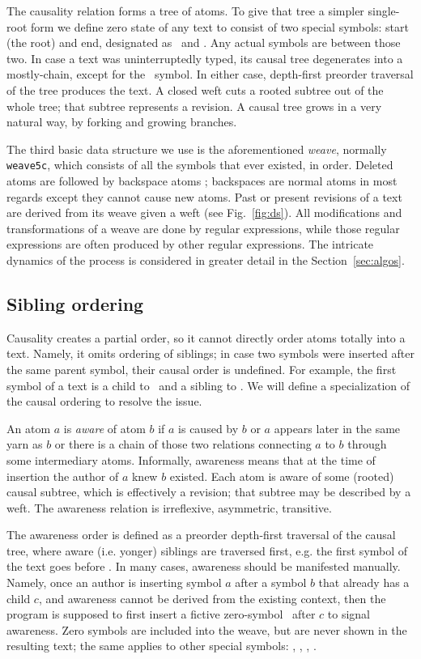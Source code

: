 \documentclass{acm_proc_article-sp}
\begin{document}
The causality relation forms a tree of atoms.
To give that tree a simpler single-root form we define zero
state of any text to consist of two special symbols: start (the root)
and end, designated as \aum ~and \eoa. Any actual symbols are
between those two.
In case a text was uninterruptedly typed, its causal tree
degenerates into a mostly-chain, except for the \eoa ~symbol.
In either case, depth-first preorder traversal of the tree
produces the text. A closed weft cuts a rooted subtree out
of the whole tree; that subtree represents a revision.
A causal tree grows in a very natural way, by forking and
growing branches.

The third basic data structure we use is the aforementioned
\emph{weave}, normally {\tt weave5c},
which consists of all the symbols that ever existed, in order. 
Deleted atoms are followed by backspace atoms \bsp; backspaces
are normal atoms in most regards except they cannot cause
new atoms.
Past or present revisions of a text are derived from its
weave given a weft (see Fig.~\ref{fig:ds}).
All modifications and transformations of a weave are done by
regular expressions, while those regular expressions are often
produced by other regular expressions. The intricate dynamics of
the process is considered in greater detail in the 
Section~\ref{sec:algos}.

\subsection {Sibling ordering}  \label{sec:siblord}

Causality creates a partial order, so it
cannot directly order atoms totally into a text. Namely, it
omits ordering of siblings; in case two symbols were inserted
after the same parent symbol, their causal order is undefined.
For example, the first symbol of a text is a child to \aum
~and a sibling to \eoa. We will define a specialization of  
the causal ordering to resolve the issue.

An atom $a$ is \emph{aware} of atom $b$ if $a$ is caused
by $b$ or $a$ appears later in the same yarn as $b$ or
there is a chain of those two relations connecting $a$ to 
$b$ through some intermediary atoms.
Informally, awareness means that at the time of insertion
the author of $a$ knew $b$ existed. 
Each atom is aware of some (rooted) causal subtree, which
is effectively a revision; that subtree may be described
by a weft.
The awareness relation is irreflexive, asymmetric, transitive.

The awareness order is 
defined as a preorder depth-first traversal of the causal
tree, where aware (i.e. yonger) siblings are traversed first,
e.g. the first symbol of the text goes
before \eoa. In many cases, awareness should be manifested
manually. Namely, once an author is inserting symbol $a$ after
a symbol $b$ that already has a child $c$, and awareness
cannot be derived from the existing context, then the program is
supposed to first insert a fictive zero-symbol \zero ~after $c$
to signal awareness.
Zero symbols are included into the
weave, but are never shown in the resulting text; the same
applies to other special symbols: \aum, \eoa, \bsp, \cnc.
\end{document}
